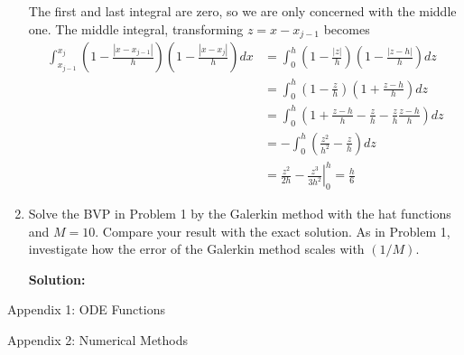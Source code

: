 \documentclass[11pt]{article}
\def\f{\frac }
\begin{document}
\begin{enumerate}

The first and last integral are zero, so we are only concerned with the middle one.
The middle integral, transforming $z = x-x_{j-1}$ becomes
\begin{align*} \int _{x_{j-1}} ^{x_{j}} \left ( 1- \f{|x-x_{j-1}|}{h}\right ) \left (  1- \f{|x-x_{j}|}{h}\right ) dx &=  \int _{0} ^{h} \left ( 1- \f{|z|}{h}\right ) \left (  1- \f{|z-h|}{h}\right ) dz \\
&=  \int _{0} ^{h} \left ( 1- \f{z}{h}\right ) \left (  1+ \f{z-h}{h}\right ) dz \\
&=  \int _{0} ^{h}\left ( 1 + \f{z-h}{h} - \f{z}{h} - \f{z}{h}\f{z-h}{h}\right ) dz \\
&=  -\int _{0} ^{h} \left ( \f{z^2}{h^2}-\f{z}{h}\right ) dz \\
&=  \left. \f{z^2}{2h}-\f{z^3}{3h^2} \right | _{0} ^{h} = \f{h}{6} \end{align*}




\item Solve the BVP in Problem 1 by the Galerkin method with the hat functions and $M=10$.
Compare your result with the exact solution.
As in Problem 1, investigate how the error of the Galerkin method scales with $(1/M)$.



\bigskip
\textbf{Solution:} 

\end{enumerate}

\clearpage
\pagebreak
{\huge Appendix 1: ODE Functions}

\clearpage
\pagebreak
{\huge Appendix 2: Numerical Methods}

\end{document}
